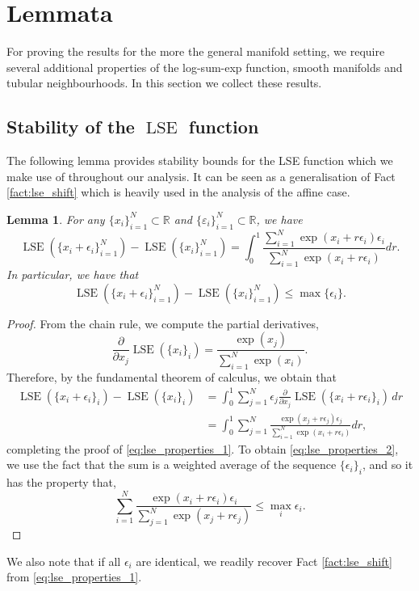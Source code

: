\documentclass[10pt]{article}
\theoremstyle{plain}
\newtheorem{lemma}[theorem]{Lemma}
\theoremstyle{definition}
\theoremstyle{remark}
\newcommand{\R}{\mathbb{R}}
\newcommand{\lse}{\operatorname{LSE}}
\begin{document}
\section{Lemmata}
For proving the results for the more the general manifold setting, we require several additional properties of the log-sum-exp function, smooth manifolds and tubular neighbourhoods. In this section we collect these results.

\subsection{Stability of the \(\lse\) function}

The following lemma provides stability bounds for the LSE function which we make use of throughout our analysis. It can be seen as a generalisation of Fact \ref{fact:lse_shift} which is heavily used in the analysis of the affine case.

\begin{lemma}\label{lem:lse_properties}
For any \(\{x_i\}_{i=1}^N \subset \R\) and \(\{\varepsilon_i\}_{i=1}^N \subset \R\), we have
\begin{equation}\label{eq:lse_properties_1}
    \lse(\{x_i + \epsilon_i\}_{i=1}^N) - \lse(\{x_i\}_{i=1}^N) = \int_0^1 \frac{\sum_{i=1}^N \exp(x_i + r \epsilon_i) \epsilon_i}{\sum_{i=1}^N \exp(x_i + r \epsilon_i)} dr.
\end{equation}
In particular, we have that
\begin{equation}\label{eq:lse_properties_2}
    \lse(\{x_i + \epsilon_i\}_{i=1}^N) - \lse(\{x_i\}_{i=1}^N) \leq \max\{\epsilon_i\}.
\end{equation}
\end{lemma}
\begin{proof}
From the chain rule, we compute the partial derivatives,
\begin{equation*}
    \frac{\partial}{\partial x_j} \lse(\{x_i\}_i) = \frac{\exp(x_j)}{\sum_{i=1}^N \exp(x_i)}.
\end{equation*}
Therefore, by the fundamental theorem of calculus, we obtain that
\begin{align*}
    \lse(\{x_i + \epsilon_i\}_i) - \lse(\{x_i\}_i) &= \int_0^1 \sum_{j=1}^N \epsilon_j \frac{\partial}{\partial x_j} \lse(\{x_i + r \epsilon_i\}_i) \, dr\\
    &= \int_0^1 \sum_{j=1}^N \frac{\exp(x_j + r \epsilon_j) \epsilon_j}{\sum_{i=1}^N \exp(x_i + r \epsilon_i)} dr,
\end{align*}
completing the proof of \eqref{eq:lse_properties_1}. To obtain \eqref{eq:lse_properties_2}, we use the fact that the sum is a weighted average of the sequence $\{\epsilon_i\}_i$, and so it has the property that,
\begin{equation*}
    \sum_{i=1}^N \frac{\exp(x_i + r \epsilon_i) \epsilon_i}{\sum_{j=1}^N \exp(x_j + r \epsilon_j)} \leq \max_i \epsilon_i.
\end{equation*}
\end{proof}
We also note that if all \(\epsilon_i\) are identical, we readily recover Fact \ref{fact:lse_shift} from \eqref{eq:lse_properties_1}.
\end{document}
